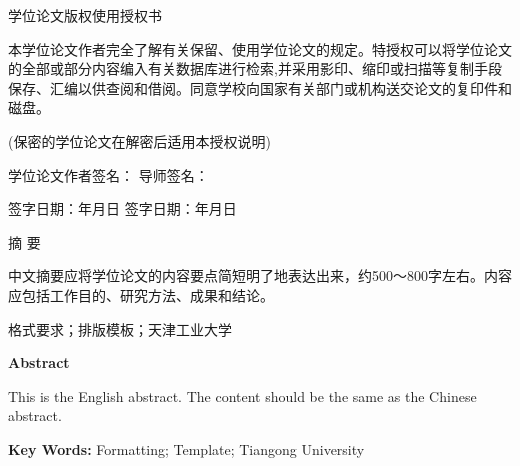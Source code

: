 \documentclass[a4paper, twoside, openright, 12pt]{ctexbook}
\begin{document}
\begin{center}
    {\heiti{} 学位论文版权使用授权书}
\end{center}
\vspace{10pt}
{\songti{} 

本学位论文作者完全了解\hspace{0.5em}{\heiti 天津工业大学}\hspace{0.5em}有关保留、使用学位论文的规定。特授权\hspace{0.5em}{\heiti 天津工业大学}\hspace{0.5em}可以将学位论文的全部或部分内容编入有关数据库进行检索,并采用影印、缩印或扫描等复制手段保存、汇编以供查阅和借阅。同意学校向国家有关部门或机构送交论文的复印件和磁盘。

(保密的学位论文在解密后适用本授权说明)

\vspace{40pt}
\noindent 学位论文作者签名：\hspace{4cm} 导师签名：\hspace{4cm}

\vspace{15pt}
\noindent 签字日期：\hspace{1cm}年\hspace{0.5cm}月\hspace{0.5cm}日\hspace{2.5cm} 签字日期：\hspace{1cm}年\hspace{0.5cm}月\hspace{0.5cm}日
}
\cleardoublepage %

\begin{center}
    {\heiti{} 摘 \quad 要}
\end{center}
\vspace{10pt}
{\songti{}

中文摘要应将学位论文的内容要点简短明了地表达出来，约500～800字左右。内容应包括工作目的、研究方法、成果和结论。

\vspace{20pt}
 格式要求；排版模板；天津工业大学
}
\cleardoublepage

\begin{center}
    {\textbf{ Abstract}}
\end{center}
\vspace{10pt}
{ %

This is the English abstract. The content should be the same as the Chinese abstract.

\vspace{20pt}
\noindent \textbf{Key Words: } Formatting; Template; Tiangong University
}
\cleardoublepage
\end{document}
